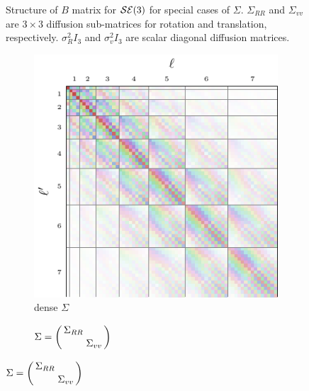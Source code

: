 \documentclass[../../main.tex]{subfiles}
\begin{document}
\begin{refsection}
\begin{figure}
\begin{subfigure}[b]{0.31\textwidth}
		\end{subfigure}
		\caption[Structure of $B^0$ matrix for $\SE{3}$]{
			Structure of $B$ matrix for $\SE{3}$ for special cases of $\Sigma$.
			$\Sigma_{RR}$ and $\Sigma_{vv}$ are $3 \times 3$ diffusion sub-matrices for rotation and translation, respectively.
			$\sigma_R^2 I_3$ and $\sigma_v^2 I_3$ are scalar diagonal diffusion matrices.
		}
		\label{fig:bmat_se3}
	\end{figure}

	\begin{figure}
		\centering
		\begin{subfigure}[b]{0.31\textwidth}
			\centering
			\caption{dense $\Sigma$}
			\includegraphics[width=\textwidth]{ftrans_se3_dense.pdf}
		\end{subfigure}
		\hfill
		\begin{subfigure}[b]{0.31\textwidth}
			\centering
			\caption{$\Sigma = \smqty(\dmat{\Sigma_{RR}, \Sigma_{vv}})$}

\end{subfigure}
\end{figure}
\end{refsection}
\end{document}
